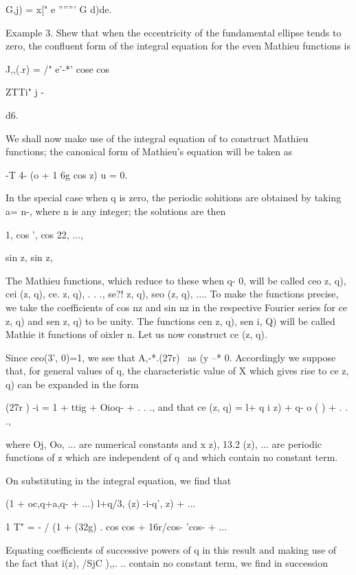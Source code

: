 G,j) = x[" e ''''''' G d)de.

Example 3. Shew that when the eccentricity of the fundamental ellipse
tends to zero, the confluent form of the integral equation for the
even Mathieu functions is

J,,(.r) = /" e'-*' cose cos

ZTTi" j -

d6.


We shall now make use of the integral equation of to construct
Mathieu functions; the canonical form of Mathieu's equation will be
taken as

-T 4- (o + 1 6g cos z) u = 0.

%
%

In the special case when q is zero, the periodic sohitions are
obtained by taking a= n-, where n is any integer; the solutions are
then

1, cos ', cos 22, ...,

sin z, sin z,

The Mathieu functions, which reduce to these when q- 0, will be called
ceo z, q), cei (z, q), ce. z, q), . . ., se?! z, q), seo (z, q), ....
To make the functions precise, we take the coefficients of cos nz and
sin nz in the respective Fourier series for ce z, q) and sen z, q) to
be unity. The functions cen z, q), sen i, Q) will be called Mathie it
functions of oixler n. Let us now construct ce (z, q).

Since ceo(3', 0)=1, we see that A,-*.(27r)~ as (y --* 0. Accordingly
we suppose that, for general values of q, the characteristic value of
X which gives rise to ce z, q) can be expanded in the form

(27r ) -i = 1 + ttig + Oioq- + . . ., and that ce (z, q) = l+ q i z)
+ q- o ( ) + . . .,

where Oj, Oo, ... are numerical constants and x z), 13.2 (z), ... are
periodic functions of z which are independent of q and which contain
no constant term.

On substituting in the integral equation, we find that

(1 + oc,q+a,q- + ...) l+q/3, (z) -i-q', z) + ...

1 T" = - / (1 + \/(32g) . cos cos + 16r/cos- 'cos- + ...

Equating coefficients of successive powers of q in this result and
making use of the fact that i(z), /SjC ),,. .. contain no constant
term, we find in succession


